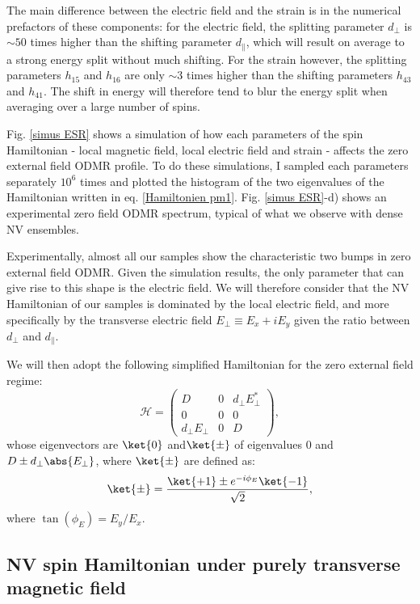 \documentclass[a4paper,11pt]{report}
\begin{document}
The main difference between the electric field and the strain is in the numerical prefactors of these components: for the electric field, the splitting parameter $d_\perp$ is $\sim 50$ times higher than the shifting parameter $d_\parallel$, which will result on average to a strong energy split without much shifting. For the strain however, the splitting parameters $h_{15}$ and $h_{16}$ are only $\sim 3$ times higher than the shifting parameters $h_{43}$ and $h_{41}$. The shift in energy will therefore tend to blur the energy split when averaging over a large number of spins.

Fig. \ref{simus ESR} shows a simulation of how each parameters of the spin Hamiltonian - local magnetic field, local electric field and strain - affects the zero external field ODMR profile. To do these simulations, I sampled each parameters separately $10^6$ times and plotted the histogram of the two eigenvalues of the Hamiltonian written in eq. \ref{Hamiltonien pm1}. Fig. \ref{simus ESR}-d) shows an experimental zero field ODMR spectrum, typical of what we observe with dense NV ensembles. 

Experimentally, almost all our samples show the characteristic two bumps in zero external field ODMR. Given the simulation results, the only parameter that can give rise to this shape is the electric field. We will therefore consider that the NV Hamiltonian of our samples is dominated by the local electric field, and more specifically by the transverse electric field $E_\perp\equiv E_x + i E_y$ given the ratio between $d_\perp$ and $d_\parallel$.

We will then adopt the following simplified Hamiltonian for the zero external field regime:
\begin{equation}
\mathcal{H}=\begin{pmatrix}
D&0&d_\perp E_\perp^* \\
0&0&0 \\
d_\perp E_\perp &0&D
\end{pmatrix},
\end{equation}
whose eigenvectors are $\ket{0}$ and$\ket{\pm}$ of eigenvalues 0 and $D\pm d_\perp \abs{E_\perp}$, where $\ket{\pm}$ are defined as:
\begin{equation}
\ket{\pm}=\frac{\ket{+1}\pm e^{-i\phi_E}\ket{-1}}{\sqrt{2}},
\end{equation}
where $\tan(\phi_E)=E_y/E_x$.

\subsection{NV spin Hamiltonian under purely transverse magnetic field}
\end{document}
